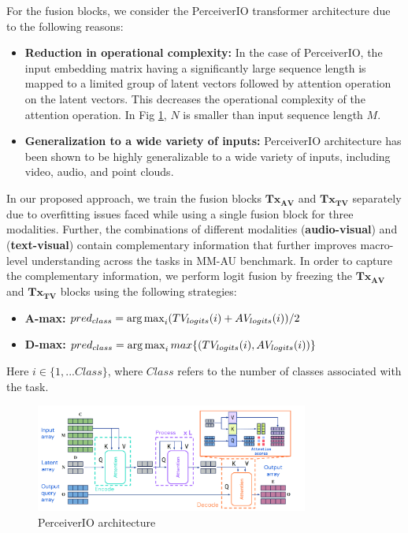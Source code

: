  For the fusion blocks, we consider the PerceiverIO transformer architecture \cite{Jaegle2021PerceiverIA} due to the following reasons:

 \begin{itemize}
    \item \textbf{Reduction in operational complexity:} In the case of PerceiverIO, the input embedding matrix having a significantly large sequence length is mapped to a limited group of latent vectors followed by attention operation on the latent vectors. This decreases the operational complexity of the attention operation. In Fig \ref{Perceiver}, $N$ is smaller than input sequence length $M$.
    \item \textbf{Generalization to a wide variety of inputs:} PerceiverIO architecture has been shown to be highly generalizable to a wide variety of inputs, including video, audio, and point clouds.
 \end{itemize}

In our proposed approach, we train the fusion blocks $\mathbf{{Tx}_{AV}}$ and $\mathbf{{Tx}_{TV}}$ separately due to overfitting issues faced while using a single fusion block for three modalities. Further, the combinations of different modalities (\textbf{audio-visual}) and (\textbf{text-visual}) contain complementary information that further improves macro-level understanding across the tasks in MM-AU benchmark. In order to capture the complementary information, we perform logit fusion by freezing the $\mathbf{{Tx}_{AV}}$ and $\mathbf{{Tx}_{TV}}$ blocks using the following strategies:

\begin{itemize}
    \item \textbf{A-max:} $pred_{class}=\operatorname*{arg\,max}_i (TV_{logits}(i)+AV_{logits}(i))/2$
    \item \textbf{D-max:} $pred_{class}=\operatorname*{arg\,max}_i max\{(TV_{logits}(i),AV_{logits}(i))\}$
\end{itemize}
Here $i \in \{1,...Class\}$, where $Class$ refers to the number of classes associated with the task.

 \begin{figure}
 \centering
    \includegraphics[width=0.8\textwidth]{figures/perceiver_architecture.png}
    \caption{PerceiverIO architecture \cite{Jaegle2021PerceiverIA}}
    \label{Perceiver}
 \end{figure}

